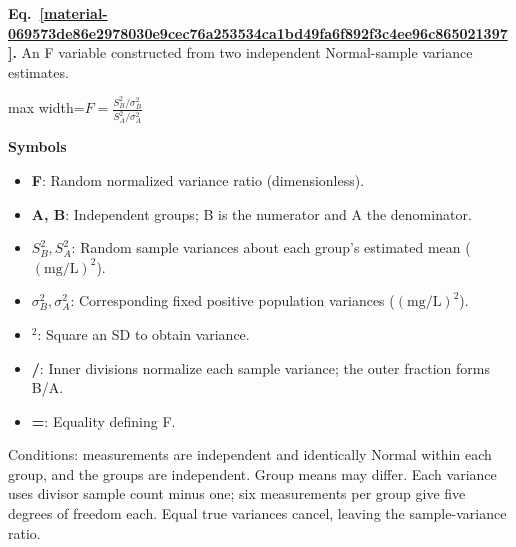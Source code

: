 \documentclass[11pt,a4paper]{article}
\begin{document}
\par\medskip
\begin{samepage}
\label{material-069573de86e2978030e9cec76a253534ca1bd49fa6f892f3c4ee96c865021397}
\noindent\textbf{Eq.~\ref*{material-069573de86e2978030e9cec76a253534ca1bd49fa6f892f3c4ee96c865021397}.} An F variable constructed from two independent Normal-sample variance estimates.\par\nopagebreak
\begin{center}\begin{adjustbox}{max width=\linewidth}$\displaystyle F=\frac{S_B^2/\sigma_B^2}{S_A^2/\sigma_A^2}$\end{adjustbox}\end{center}

\par\noindent\textbf{Symbols}

\begin{itemize}\setlength{\itemsep}{1pt}\setlength{\parsep}{0pt}
\item \textbf{F}: Random normalized variance ratio (dimensionless).
\item \textbf{A, B}: Independent groups; B is the numerator and A the denominator.
\item \textbf{\(S_B^2, S_A^2\)}: Random sample variances about each group's estimated mean (\(\mathrm{(mg/L)^2}\)).
\item \textbf{\(σ_B^2, σ_A^2\)}: Corresponding fixed positive population variances (\(\mathrm{(mg/L)^2}\)).
\item \textbf{\ensuremath{{}^2}}: Square an SD to obtain variance.
\item \textbf{/}: Inner divisions normalize each sample variance; the outer fraction forms B/A.
\item \textbf{=}: Equality defining F.
\end{itemize}

Conditions: measurements are independent and identically Normal within each group, and the groups are independent. Group means may differ. Each variance uses divisor sample count minus one; six measurements per group give five degrees of freedom each. Equal true variances cancel, leaving the sample-variance ratio.

\end{samepage}
\medskip
\end{document}
